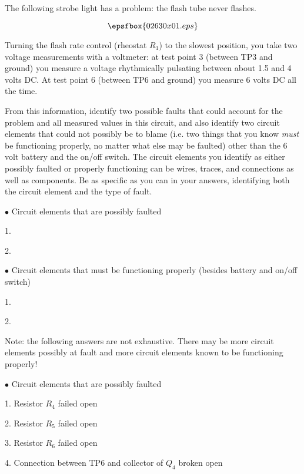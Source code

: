 

The following strobe light has a problem: the flash tube never flashes.

$$\epsfbox{02630x01.eps}$$

Turning the flash rate control (rheostat $R_1$) to the slowest position, you take two voltage measurements with a voltmeter: at test point 3 (between TP3 and ground) you measure a voltage rhythmically pulsating between about 1.5 and 4 volts DC.  At test point 6 (between TP6 and ground) you measure 6 volts DC all the time.

From this information, identify two possible faults that could account for the problem and all measured values in this circuit, and also identify two circuit elements that could not possibly be to blame (i.e. two things that you know {\it must} be functioning properly, no matter what else may be faulted) other than the 6 volt battery and the on/off switch.  The circuit elements you identify as either possibly faulted or properly functioning can be wires, traces, and connections as well as components.  Be as specific as you can in your answers, identifying both the circuit element and the type of fault.

\medskip
\goodbreak
\item{$\bullet$} Circuit elements that are possibly faulted
\item{1.}
\item{2.} 
\medskip

\medskip
\goodbreak
\item{$\bullet$} Circuit elements that must be functioning properly (besides battery and on/off switch)
\item{1.} 
\item{2.} 
\medskip







Note: the following answers are not exhaustive.  There may be more circuit elements possibly at fault and more circuit elements known to be functioning properly!

\medskip
\goodbreak
\item{$\bullet$} Circuit elements that are possibly faulted
\item{1.} Resistor $R_4$ failed open
\item{2.} Resistor $R_5$ failed open
\item{3.} Resistor $R_6$ failed open
\item{4.} Connection between TP6 and collector of $Q_4$ broken open
\medskip

